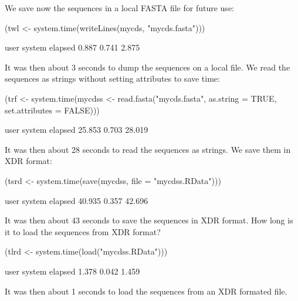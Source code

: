 \documentclass{article}
\begin{document}
We save now the sequences in a local FASTA file for future use:

\begin{Schunk}
\begin{Sinput}
 (twl <- system.time(writeLines(mycds, "mycds.fasta")))
\end{Sinput}
\begin{Soutput}
   user  system elapsed 
  0.887   0.741   2.875 
\end{Soutput}
\end{Schunk}

It was then about 3 seconds
to dump the sequences on a local file. We read the sequences as strings
without setting attributes to save time:

\begin{Schunk}
\begin{Sinput}
 (trf <- system.time(mycdss <- read.fasta("mycds.fasta", as.string = TRUE, 
     set.attributes = FALSE)))
\end{Sinput}
\begin{Soutput}
   user  system elapsed 
 25.853   0.703  28.019 
\end{Soutput}
\end{Schunk}

It was then about 28 seconds
to read the sequences as strings. We save them in XDR format:

\begin{Schunk}
\begin{Sinput}
 (tsrd <- system.time(save(mycdss, file = "mycdss.RData")))
\end{Sinput}
\begin{Soutput}
   user  system elapsed 
 40.935   0.357  42.696 
\end{Soutput}
\end{Schunk}

It was then about 43 seconds
to save the sequences in XDR format. How long is it to load the sequences
from XDR format?

\begin{Schunk}
\begin{Sinput}
 (tlrd <- system.time(load("mycdss.RData")))
\end{Sinput}
\begin{Soutput}
   user  system elapsed 
  1.378   0.042   1.459 
\end{Soutput}
\end{Schunk}

It was then about 1 seconds
to load the sequences from an XDR formated file. 
\end{document}
